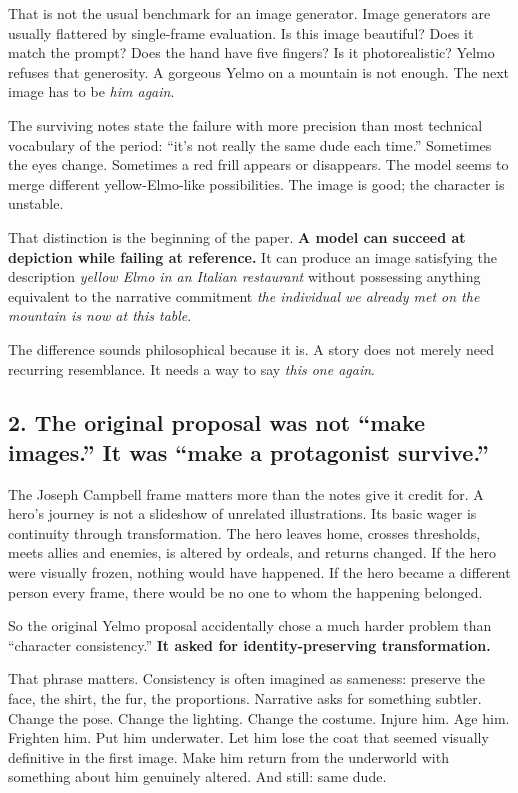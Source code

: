\documentclass[
]{article}
\begin{document}
That is not the usual benchmark for an image generator. Image generators
are usually flattered by single-frame evaluation. Is this image
beautiful? Does it match the prompt? Does the hand have five fingers? Is
it photorealistic? Yelmo refuses that generosity. A gorgeous Yelmo on a
mountain is not enough. The next image has to be \emph{him again}.

The surviving notes state the failure with more precision than most
technical vocabulary of the period: ``it's not really the same dude each
time.'' Sometimes the eyes change. Sometimes a red frill appears or
disappears. The model seems to merge different yellow-Elmo-like
possibilities. The image is good; the character is unstable.

That distinction is the beginning of the paper. \textbf{A model can
succeed at depiction while failing at reference.} It can produce an
image satisfying the description \emph{yellow Elmo in an Italian
restaurant} without possessing anything equivalent to the narrative
commitment \emph{the individual we already met on the mountain is now at
this table}.

The difference sounds philosophical because it is. A story does not
merely need recurring resemblance. It needs a way to say \emph{this one
again}.

\subsection{2. The original proposal was not ``make images.'' It was
``make a protagonist
survive.''}\label{the-original-proposal-was-not-make-images.-it-was-make-a-protagonist-survive.}

The Joseph Campbell frame matters more than the notes give it credit
for. A hero's journey is not a slideshow of unrelated illustrations. Its
basic wager is continuity through transformation. The hero leaves home,
crosses thresholds, meets allies and enemies, is altered by ordeals, and
returns changed. If the hero were visually frozen, nothing would have
happened. If the hero became a different person every frame, there would
be no one to whom the happening belonged.

So the original Yelmo proposal accidentally chose a much harder problem
than ``character consistency.'' \textbf{It asked for identity-preserving
transformation.}

That phrase matters. Consistency is often imagined as sameness: preserve
the face, the shirt, the fur, the proportions. Narrative asks for
something subtler. Change the pose. Change the lighting. Change the
costume. Injure him. Age him. Frighten him. Put him underwater. Let him
lose the coat that seemed visually definitive in the first image. Make
him return from the underworld with something about him genuinely
altered. And still: same dude.
\end{document}
